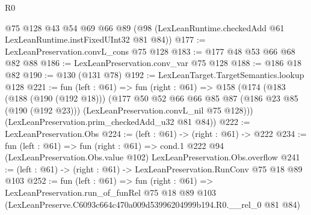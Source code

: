 \begin{lexlean}{R0}
\begin{coremodule}
    @75
    @128
    @43
    @54
    @69
    @66
    @89
    (@98 (LexLeanRuntime.checkedAdd @61 LexLeanRuntime.instFixedUInt32 @81 @84))
@177 := LexLeanPreservation.convL_cons @75 @128
@183 := @177 @48 @53 @66 @68 @82 @88
@186 := LexLeanPreservation.conv_var @75 @128
@188 := @186 @18 @82
@190 := @130 (@131 @78)
@192 := LexLeanTarget.TargetSemantics.lookup @128
@221 := fun (left : @61) =>
  fun (right : @61) =>
  @158
    (@174
      (@183
        (@188 (@190 (@192 @18)))
        (@177
          @50
          @52
          @66
          @66
          @85
          @87
          (@186 @23 @85 (@190 (@192 @23)))
          (LexLeanPreservation.convL_nil @75 @128)))
      (LexLeanPreservation.prim_checkedAdd_u32 @81 @84))
@222 := LexLeanPreservation.Obs
@224 := (left : @61) -> (right : @61) -> @222
@234 := fun (left : @61) =>
  fun (right : @61) =>
  cond.{1} @222 @94 (LexLeanPreservation.Obs.value @102) LexLeanPreservation.Obs.overflow
@241 := (left : @61) -> (right : @61) -> LexLeanPreservation.RunConv @75 @18 @89 @103
@252 := fun (left : @61) =>
  fun (right : @61) =>
  LexLeanPreservation.run_of_funRel
    @75
    @18
    @89
    @103
    (LexLeanPreserve.C6093c664c470a009d53996204999b194.R0.__rel_0 @81 @84)
\end{coremodule}
\end{lexlean}
